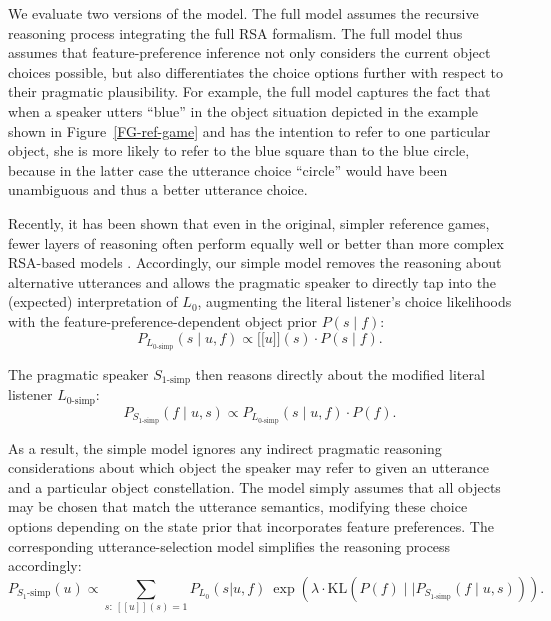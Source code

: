 \documentclass[11pt,a4paper]{article}
\newcommand{\sem}[1]{\mbox{$[\![$#1$]\!]$}}
\begin{document}
We evaluate two versions of the model. 
The full model assumes the recursive reasoning process integrating the full RSA formalism.  
The full model thus assumes that feature-preference inference not only considers the current object choices possible, but also differentiates the choice options further with respect to their pragmatic plausibility. 
For example, the full model captures the fact that when a speaker utters ``blue'' in the object situation depicted in the example shown in Figure~\ref{FG-ref-game} and has the intention to refer to one particular object, she is more likely to refer to the blue square than to the blue circle, because in the latter case the utterance choice ``circle'' would have been unambiguous and thus a better utterance choice.

Recently, it has been shown that even in the original, simpler reference games, fewer layers of reasoning often perform equally well or better than more complex RSA-based models \cite{sikos2019}.
Accordingly, our simple model removes the reasoning about alternative utterances and allows the pragmatic speaker to directly tap into the (expected) interpretation of $L_0$, augmenting the literal listener's choice likelihoods with the feature-preference-dependent object prior $P(s\mid f)$:
\begin{equation}
P_{L_{0\textrm{-simp}}}(s\mid u,f) \propto \sem{$u$}(s) \cdot P(s\mid f).
\end{equation}

The pragmatic speaker $S_{1\textrm{-simp}}$ then reasons directly about the modified literal listener $L_{0\textrm{-simp}}$: 
\begin{equation}
P_{S_{1\textrm{-simp}}}(f\mid u,s) \propto P_{L_{0\textrm{-simp}}}(s\mid u,f) \cdot P(f).
\end{equation}

As a result, the simple model ignores any indirect pragmatic reasoning considerations about which object the speaker may refer to given an utterance and a particular object constellation.
The model simply assumes that all objects may be chosen that match the utterance semantics, modifying these choice options depending on the state prior that incorporates feature preferences. The corresponding utterance-selection model simplifies the reasoning process accordingly:
\begin{equation}
P_{S_1\textrm{-simp}}(u) \propto \sum_{s:\  [\![u]\!](s)=1} P_{L_0}(s|u,f)\ \exp(\lambda \cdot \textrm{KL}(P(f)\mid\mid P_{S_{1\textrm{-simp}}}(f\mid u,s))).
\label{eq:kldivlambdasimp}
\end{equation}
\end{document}
